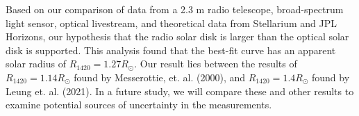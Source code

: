 Based on our comparison of data from a 2.3 m radio telescope, broad-spectrum light sensor, optical livestream, and theoretical data from Stellarium and JPL Horizons, our hypothesis that the radio solar disk is larger than the optical solar disk is supported.
This analysis found that the best-fit curve has an apparent solar radius of $R_{\mathrm{1420}} = 1.27 R_{\odot}$.
Our result lies between the results of $R_{\mathrm{1420}} = 1.14 R_{\odot}$ found by Messerottie, et. al. (2000), and $R_{\mathrm{1420}} = 1.4 R_{\odot}$ found by Leung et. al. (2021).
In a future study, we will compare these and other results to examine potential sources of uncertainty in the measurements.
